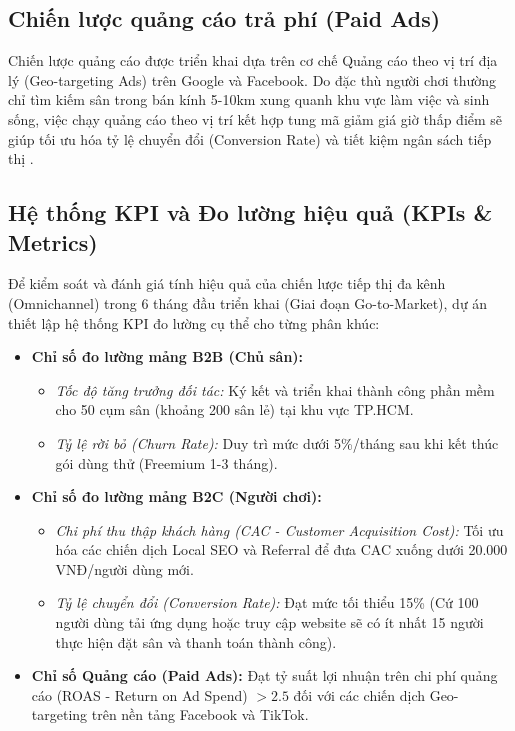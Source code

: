 \subsection{Chiến lược quảng cáo trả phí (Paid Ads)}
Chiến lược quảng cáo được triển khai dựa trên cơ chế Quảng cáo theo vị trí địa lý (Geo-targeting Ads) trên Google và Facebook. Do đặc thù người chơi thường chỉ tìm kiếm sân trong bán kính 5-10km xung quanh khu vực làm việc và sinh sống, việc chạy quảng cáo theo vị trí kết hợp tung mã giảm giá giờ thấp điểm sẽ giúp tối ưu hóa tỷ lệ chuyển đổi (Conversion Rate) và tiết kiệm ngân sách tiếp thị \cite{ref:kotler}.

\subsection{Hệ thống KPI và Đo lường hiệu quả (KPIs \& Metrics)}
Để kiểm soát và đánh giá tính hiệu quả của chiến lược tiếp thị đa kênh (Omnichannel) trong 6 tháng đầu triển khai (Giai đoạn Go-to-Market), dự án thiết lập hệ thống KPI đo lường cụ thể cho từng phân khúc:
\begin{itemize}
    \item \textbf{Chỉ số đo lường mảng B2B (Chủ sân):}
    \begin{itemize}
        \item \textit{Tốc độ tăng trưởng đối tác:} Ký kết và triển khai thành công phần mềm cho 50 cụm sân (khoảng 200 sân lẻ) tại khu vực TP.HCM.
        \item \textit{Tỷ lệ rời bỏ (Churn Rate):} Duy trì mức dưới 5\%/tháng sau khi kết thúc gói dùng thử (Freemium 1-3 tháng).
    \end{itemize}
    \item \textbf{Chỉ số đo lường mảng B2C (Người chơi):}
    \begin{itemize}
        \item \textit{Chi phí thu thập khách hàng (CAC - Customer Acquisition Cost):} Tối ưu hóa các chiến dịch Local SEO và Referral để đưa CAC xuống dưới 20.000 VNĐ/người dùng mới.
        \item \textit{Tỷ lệ chuyển đổi (Conversion Rate):} Đạt mức tối thiểu 15\% (Cứ 100 người dùng tải ứng dụng hoặc truy cập website sẽ có ít nhất 15 người thực hiện đặt sân và thanh toán thành công).
    \end{itemize}
    \item \textbf{Chỉ số Quảng cáo (Paid Ads):} Đạt tỷ suất lợi nhuận trên chi phí quảng cáo (ROAS - Return on Ad Spend) $> 2.5$ đối với các chiến dịch Geo-targeting trên nền tảng Facebook và TikTok.
\end{itemize}